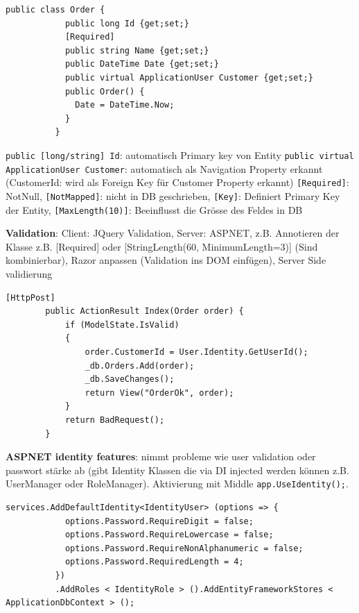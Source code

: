 \documentclass[10pt,landscape]{article}
\begin{document}
\begin{multicols}{2}
        \begin{lstlisting}[style=CSharp]
          public class Order {
            public long Id {get;set;}
            [Required]
            public string Name {get;set;}
            public DateTime Date {get;set;}
            public virtual ApplicationUser Customer {get;set;}
            public Order() {
              Date = DateTime.Now;
            }
          }
        \end{lstlisting}

        \lstinline{public [long/string] Id}: automatisch Primary key von Entity
        \lstinline{public virtual ApplicationUser Customer}: automatisch als Navigation Property erkannt (CustomerId: wird als Foreign Key für Customer Property erkannt)
        \lstinline{[Required]}: NotNull, \lstinline{[NotMapped]}: nicht in DB geschrieben, \lstinline{[Key]}: Definiert Primary Key der Entity, \lstinline{[MaxLength(10)]}: Beeinflusst die Grösse des Feldes in DB

        \textbf{Validation}: Client: JQuery Validation, Server: ASPNET, z.B. Annotieren der Klasse z.B. [Required] oder [StringLength(60, MinimumLength=3)] (Sind kombinierbar), Razor anpassen (Validation ins DOM einfügen), Server Side validierung

        \begin{lstlisting}[style=CSharp]
        [HttpPost]
        public ActionResult Index(Order order) {
            if (ModelState.IsValid)
            {
                order.CustomerId = User.Identity.GetUserId();
                _db.Orders.Add(order);
                _db.SaveChanges();
                return View("OrderOk", order);
            }
            return BadRequest();
        }
        \end{lstlisting}

        \textbf{ASPNET identity features}: nimmt probleme wie user validation oder passwort stärke ab (gibt Identity Klassen die via DI injected werden können z.B. UserManager oder RoleManager).
        Aktivierung mit Middle \lstinline{app.UseIdentity();}.

        \begin{lstlisting}[style=CSharp]
        services.AddDefaultIdentity<IdentityUser> (options => {
            options.Password.RequireDigit = false;
            options.Password.RequireLowercase = false;
            options.Password.RequireNonAlphanumeric = false;
            options.Password.RequiredLength = 4;
          })
          .AddRoles < IdentityRole > ().AddEntityFrameworkStores < ApplicationDbContext > ();
        \end{lstlisting}


\end{multicols}
\end{document}
